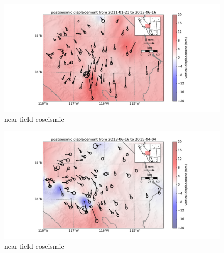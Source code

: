 \documentclass[12pt]{article}
\begin{document}
\begin{figure}
\includegraphics[scale=0.6]{Figures/far_field_data_3}
\centering 
\caption{near field coseismic}
\label{farfield3}
\end{figure}

\begin{figure}
\includegraphics[scale=0.6]{Figures/far_field_data_4}
\centering 
\caption{near field coseismic}
\label{farfield4}
\end{figure}
\end{document}
